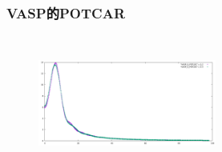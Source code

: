 \frame
{
	\frametitle{\rm{VASP}的\rm{POTCAR}}
\begin{minipage}{0.40\textwidth}
\centering
\fontsize{2.7pt}{1.2pt}\selectfont{
}
\end{minipage}
\begin{minipage}{0.58\textwidth}
{\fontsize{5.5pt}{4.2pt}}
\begin{figure}[t!]
\centering
\vspace{-0.15in}
\includegraphics[width=2.3in,height=1.75in,viewport=0 0 1150 650, clip]{Figures/POT_G-dat.pdf}
\label{local-potential}
\end{figure}
\end{minipage}
}

